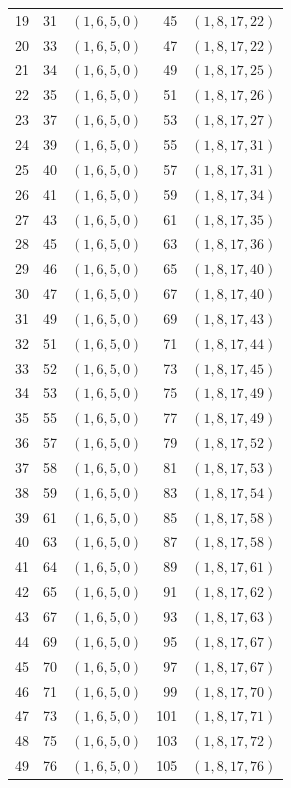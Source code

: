 \begin{center}
\begin{longtable}{@{}rrlrl@{}}
19 & 31 & $(1,6,5,0)$ & 45 & $(1,8,17,22)$\\
20 & 33 & $(1,6,5,0)$ & 47 & $(1,8,17,22)$\\
21 & 34 & $(1,6,5,0)$ & 49 & $(1,8,17,25)$\\
22 & 35 & $(1,6,5,0)$ & 51 & $(1,8,17,26)$\\
23 & 37 & $(1,6,5,0)$ & 53 & $(1,8,17,27)$\\
24 & 39 & $(1,6,5,0)$ & 55 & $(1,8,17,31)$\\
25 & 40 & $(1,6,5,0)$ & 57 & $(1,8,17,31)$\\
26 & 41 & $(1,6,5,0)$ & 59 & $(1,8,17,34)$\\
27 & 43 & $(1,6,5,0)$ & 61 & $(1,8,17,35)$\\
28 & 45 & $(1,6,5,0)$ & 63 & $(1,8,17,36)$\\
29 & 46 & $(1,6,5,0)$ & 65 & $(1,8,17,40)$\\
30 & 47 & $(1,6,5,0)$ & 67 & $(1,8,17,40)$\\
31 & 49 & $(1,6,5,0)$ & 69 & $(1,8,17,43)$\\
32 & 51 & $(1,6,5,0)$ & 71 & $(1,8,17,44)$\\
33 & 52 & $(1,6,5,0)$ & 73 & $(1,8,17,45)$\\
34 & 53 & $(1,6,5,0)$ & 75 & $(1,8,17,49)$\\
35 & 55 & $(1,6,5,0)$ & 77 & $(1,8,17,49)$\\
36 & 57 & $(1,6,5,0)$ & 79 & $(1,8,17,52)$\\
37 & 58 & $(1,6,5,0)$ & 81 & $(1,8,17,53)$\\
38 & 59 & $(1,6,5,0)$ & 83 & $(1,8,17,54)$\\
39 & 61 & $(1,6,5,0)$ & 85 & $(1,8,17,58)$\\
40 & 63 & $(1,6,5,0)$ & 87 & $(1,8,17,58)$\\
41 & 64 & $(1,6,5,0)$ & 89 & $(1,8,17,61)$\\
42 & 65 & $(1,6,5,0)$ & 91 & $(1,8,17,62)$\\
43 & 67 & $(1,6,5,0)$ & 93 & $(1,8,17,63)$\\
44 & 69 & $(1,6,5,0)$ & 95 & $(1,8,17,67)$\\
45 & 70 & $(1,6,5,0)$ & 97 & $(1,8,17,67)$\\
46 & 71 & $(1,6,5,0)$ & 99 & $(1,8,17,70)$\\
47 & 73 & $(1,6,5,0)$ & 101 & $(1,8,17,71)$\\
48 & 75 & $(1,6,5,0)$ & 103 & $(1,8,17,72)$\\
49 & 76 & $(1,6,5,0)$ & 105 & $(1,8,17,76)$\\

\end{longtable}
\end{center}
